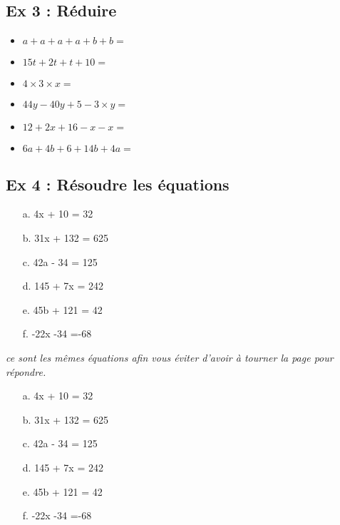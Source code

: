 \subsection*{Ex 3 : Réduire}

\begin{multicols}{2}\begin{itemize}[label={$\bullet$}]
  \item $a+a+a+a+b+b =$ \dotfill
  \item $15t + 2t + t +10 = $\dotfill
  \item $4 \times 3 \times x = $ \dotfill
  \item $44y - 40y + 5 - 3 \times y = $\dotfill
  \item $12 + 2x + 16 - x - x =$\dotfill
  \item $6a + 4b + 6+ 14b + 4a =$\dotfill
\end{itemize}\end{multicols}


\subsection*{Ex 4 : Résoudre les équations}

\begin{multicols}{3}\begin{enumerate}
  \item[a.] 4x + 10 = 32
  \item[b.] 31x + 132 = 625
  \item[c.] 42a - 34 = 125
  \item[d.] 145 + 7x = 242
  \item[e.] 45b + 121 = 42
  \item[f.] -22x -34 =-68   
\end{enumerate}\end{multicols}

\Pointilles[20] \newpage 

\begin{center}\textit{ce sont les mêmes équations afin vous éviter d'avoir à tourner la page pour répondre.}\end{center}

\begin{multicols}{3}\begin{enumerate}
  \item[a.] 4x + 10 = 32
  \item[b.] 31x + 132 = 625
  \item[c.] 42a - 34 = 125
  \item[d.] 145 + 7x = 242
  \item[e.] 45b + 121 = 42
  \item[f.] -22x -34 =-68   
\end{enumerate}\end{multicols}

\Pointilles[46]



